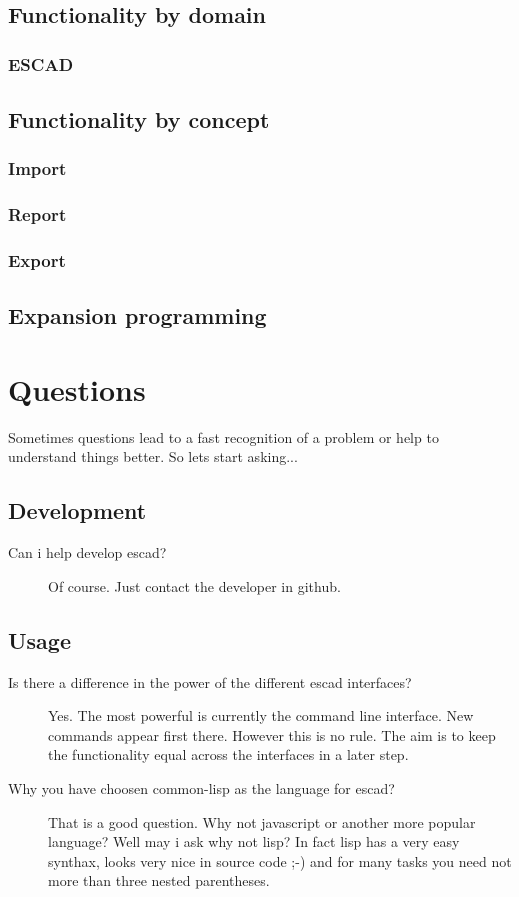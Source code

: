 \documentclass[a4paper, 12pt, openany]{scrbook}
\begin{document}
\section{Functionality by domain}
\subsection{ESCAD}
\section{Functionality by concept}
\subsection{Import}
\subsection{Report}
\subsection{Export}
\section{Expansion programming}
\chapter{Questions}
Sometimes questions lead to a fast recognition of a problem or help to understand things better. So lets start asking...
\section{Development}
\begin{description}
\item[Can i help develop escad?] Of course. Just contact the developer in github.
\end{description}
\section{Usage}
\begin{description}
\item[Is there a difference in the power of the different escad interfaces?] Yes. The most powerful is currently the command line interface. New commands appear first there. However this is no rule. The aim is to keep the functionality equal across the interfaces in a later step.
\item[Why you have choosen common-lisp as the language for escad?] That is a good question. Why not javascript or another more popular language? Well may i ask why not lisp? In fact lisp has a very easy synthax, looks very nice in source code ;-) and for many tasks you need not more than three nested parentheses.
\end{description}
\end{document}
